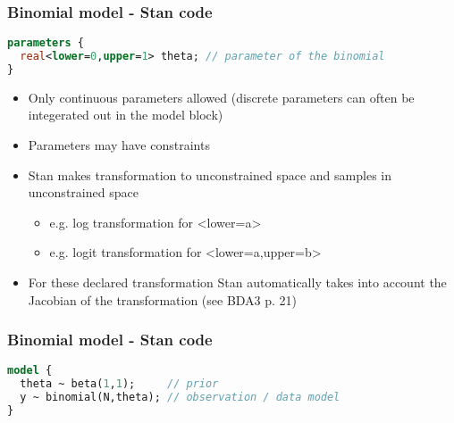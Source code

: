 \documentclass[finnish,english,t]{beamer}
\begin{document}
\begin{frame}[fragile]
  \frametitle{Binomial model - Stan code}

  {\small
\begin{lstlisting}[language=Stan]
parameters {
  real<lower=0,upper=1> theta; // parameter of the binomial
}
\end{lstlisting}}

  \begin{itemize}
  \item Only continuous parameters allowed (discrete parameters can
    often be integerated out in the model block)
  \item Parameters may have constraints
  \item Stan makes transformation to unconstrained space and samples in unconstrained space
    \begin{itemize}
    \item e.g. log transformation for <lower=a> 
    \item e.g. logit transformation for <lower=a,upper=b> 
    \end{itemize}
  \item<2-> For these declared transformation Stan automatically takes
    into account the Jacobian of the transformation (see BDA3 p. 21)
  \end{itemize}
\end{frame}

\begin{frame}[fragile]
  \frametitle{Binomial model - Stan code}
  
  {\small
\begin{lstlisting}[language=Stan]
model {
  theta ~ beta(1,1);     // prior
  y ~ binomial(N,theta); // observation / data model
}
\end{lstlisting}}

\end{frame} 
\end{document}
